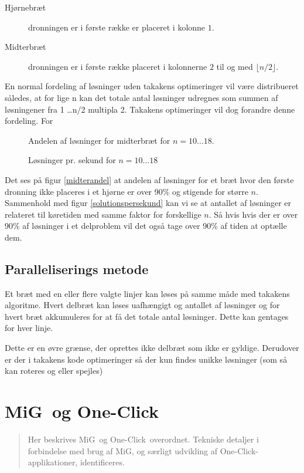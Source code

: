 \documentclass[pdf,draft,a4paper,11pt]{article}
\newcommand{\mig}{MiG}
\newcommand{\oc}{One-Click}
\begin{document}
\begin{description}
	\item[Hjørnebræt] dronningen er i første række er placeret i kolonne $1$.
	\item[Midterbræt] dronningen er i første række placeret i kolonnerne $2$  til og med $\lfloor n/2 \rfloor$.
\end{description}

En normal fordeling af løsninger uden takakens optimeringer vil være distribueret således, at for lige n kan det totale antal løsninger udregnes som summen af løsningener fra 1 \ldots n/2 multipla 2. Takakens optimeringer vil dog forandre denne fordeling. For 


\begin{figure}
\caption{Andelen af løsninger for midterbræt for $n=10\ldots18$.}
\label{fig:midterandel}
\end{figure}


\begin{figure}
\caption{Løsninger pr. sekund for $n=10\ldots18$}
\label{fig:solutionspersekund}
\end{figure}

Det ses på figur \ref{midterandel} at andelen af løsninger for et bræt hvor den første dronning ikke placeres i et hjørne er over 90\% og stigende for større $n$. Sammenhold med figur \ref{solutionspersekund} kan vi se at antallet af løsninger er relateret til køretiden med samme faktor for forskellige $n$. Så hvis hvis der er over 90\% af løsninger i et delproblem vil det også tage over 90\% af tiden at optælle dem.

\subsection{Paralleliserings metode}\label{parrallel}

Et bræt med en eller flere valgte linjer kan løses på samme måde med takakens algoritme. Hvert delbræt kan løses uafhængigt og antallet af løsninger og for hvert bræt akkumuleres for at få det totale antal løsninger. Dette kan gentages for hver linje. 

Dette er en øvre grænse, der oprettes ikke delbræt som ikke er gyldige. Derudover er der i takakens kode optimeringer så der kun findes unikke løsninger (som så kan roteres og eller spejles) 

\section{\mig\ og \oc}\label{migogoneclick}
\begin{verse}
	Her beskrives \mig\ og \oc\ overordnet. Tekniske detaljer i forbindelse med brug af \mig, og særligt udvikling af \oc-applikationer, identificeres.  
\end{verse}
\end{document}
